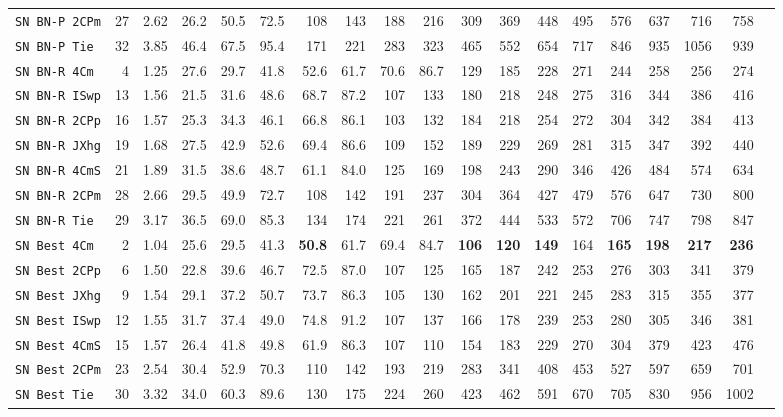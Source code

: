 \begin{tabular}{l | r @{~~} r | r@{~~}r@{~~}r@{~~}r@{~~}r@{~~}r@{~~}r@{~~}r@{~~}r@{~~}r@{~~}r@{~~}r@{~~}r@{~~}r@{~~}r@{~~}r|}
\verb+SN BN-P 2CPm+ & 27 & 2.62 & 26.2&50.5&72.5&108&143&188&216&309&369&448&495&576&637&716&758\\
\verb+SN BN-P Tie + & 32 & 3.85 & 46.4&67.5&95.4&171&221&283&323&465&552&654&717&846&935&1056&939\smallskip \\
\verb+SN BN-R 4Cm + & 4 & 1.25 & 27.6&29.7&41.8&52.6&61.7&70.6&86.7&129&185&228&271&244&258&256&274\\
\verb+SN BN-R ISwp+ & 13 & 1.56 & 21.5&31.6&48.6&68.7&87.2&107&133&180&218&248&275&316&344&386&416\\
\verb+SN BN-R 2CPp+ & 16 & 1.57 & 25.3&34.3&46.1&66.8&86.1&103&132&184&218&254&272&304&342&384&413\\
\verb+SN BN-R JXhg+ & 19 & 1.68 & 27.5&42.9&52.6&69.4&86.6&109&152&189&229&269&281&315&347&392&440\\
\verb+SN BN-R 4CmS+ & 21 & 1.89 & 31.5&38.6&48.7&61.1&84.0&125&169&198&243&290&346&426&484&574&634\\
\verb+SN BN-R 2CPm+ & 28 & 2.66 & 29.5&49.9&72.7&108&142&191&237&304&364&427&479&576&647&730&800\\
\verb+SN BN-R Tie + & 29 & 3.17 & 36.5&69.0&85.3&134&174&221&261&372&444&533&572&706&747&798&847\smallskip \\
\verb+SN Best 4Cm + & 2 & 1.04 & 25.6&29.5&41.3&\textbf{50.8}&61.7&69.4&84.7&\textbf{106}&\textbf{120}&\textbf{149}&164&\textbf{165}&\textbf{198}&\textbf{217}&\textbf{236}\\
\verb+SN Best 2CPp+ & 6 & 1.50 & 22.8&39.6&46.7&72.5&87.0&107&125&165&187&242&253&276&303&341&379\\
\verb+SN Best JXhg+ & 9 & 1.54 & 29.1&37.2&50.7&73.7&86.3&105&130&162&201&221&245&283&315&355&377\\
\verb+SN Best ISwp+ & 12 & 1.55 & 31.7&37.4&49.0&74.8&91.2&107&137&166&178&239&253&280&305&346&381\\
\verb+SN Best 4CmS+ & 15 & 1.57 & 26.4&41.8&49.8&61.9&86.3&107&110&154&183&229&270&304&379&423&476\\
\verb+SN Best 2CPm+ & 23 & 2.54 & 30.4&52.9&70.3&110&142&193&219&283&341&408&453&527&597&659&701\\
\verb+SN Best Tie + & 30 & 3.32 & 34.0&60.3&89.6&130&175&224&260&423&462&591&670&705&830&956&1002\\
\end{tabular}
